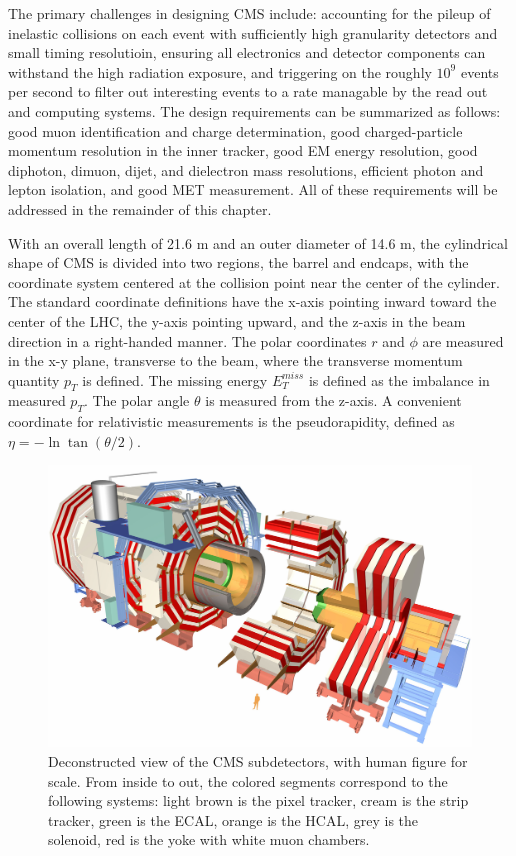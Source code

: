 \indent The primary challenges in designing CMS include: accounting for the pileup of inelastic collisions on each event with sufficiently high granularity detectors and small timing resolutioin, ensuring all electronics and detector components can withstand the high radiation exposure, and triggering on the roughly $10^9$ events per second to filter out interesting events to a rate managable by the read out and computing systems. The design requirements can be summarized as follows: good muon identification and charge determination, good charged-particle momentum resolution in the inner tracker, good EM energy resolution, good diphoton, dimuon, dijet, and dielectron mass resolutions, efficient photon and lepton isolation, and good MET measurement. All of these requirements will be addressed in the remainder of this chapter.

\indent With an overall length of 21.6 m and an outer diameter of 14.6 m, the cylindrical shape of CMS is divided into two regions, the barrel and endcaps, with the coordinate system centered at the collision point near the center of the cylinder. The standard coordinate definitions have the x-axis pointing inward toward the center of the LHC, the y-axis pointing upward, and the z-axis in the beam direction in a right-handed manner. The polar coordinates $r$ and $\phi$ are measured in the x-y plane, transverse to the beam, where the transverse momentum quantity $p_T$ is defined. The missing energy $E_T^{miss}$ is defined as the imbalance in measured $p_T$. The polar angle $\theta$ is measured from the z-axis. A convenient coordinate for relativistic measurements is the pseudorapidity, defined as $\eta = -\ln{\tan(\theta/2)}$. 

\begin{figure}[tbh]
\centering
\includegraphics[width=6in]{figures/cms.jpg}
\caption{Deconstructed view of the CMS subdetectors, with human figure for scale. From inside to out, the colored segments correspond to the following systems: light brown is the pixel tracker, cream is the strip tracker, green is the ECAL, orange is the HCAL, grey is the solenoid, red is the yoke with white muon chambers. }
\label{fig:cms}
\end{figure}

